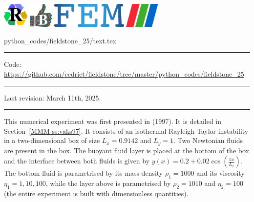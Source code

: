 \noindent
\includegraphics[height=1.25cm]{images/pictograms/replication}
\includegraphics[height=1.25cm]{images/pictograms/benchmark}
\includegraphics[height=1.25cm]{images/pictograms/FEM}
\includegraphics[height=1.25cm]{images/pictograms/paraview}


\begin{flushright} {\tiny {\color{gray} python\_codes/fieldstone\_25/text.tex}} \end{flushright}

\par\noindent\rule{\textwidth}{0.4pt}

\begin{center}
\inpython
{\small Code: \url{https://github.com/cedrict/fieldstone/tree/master/python_codes/fieldstone_25}}
\end{center}

\par\noindent\rule{\textwidth}{0.4pt}

Last revision: March 11th, 2025.

\par\noindent\rule{\textwidth}{0.4pt}


This numerical experiment was first presented in \textcite{vaks97} (1997). It is detailed 
in Section~\ref{MMM-ss:vaks97}. It consists of an isothermal Rayleigh-Taylor instability 
in a two-dimensional box of size $L_x=0.9142$ and $L_y=1$. Two Newtonian fluids are present 
in the box. The buoyant fluid layer is placed at the bottom of the box and the interface 
between both fluids is given by $y(x)=0.2+0.02\cos \left( \frac{\pi x}{L_x} \right)$.
The bottom fluid is parametrised by its mass density $\rho_1=1000$ and its viscosity $\eta_1=1,10,100$, 
while the layer above is parametrised by $\rho_2=1010$ and $\eta_2=100$ (the entire
experiment is built with dimensionless quantities).

